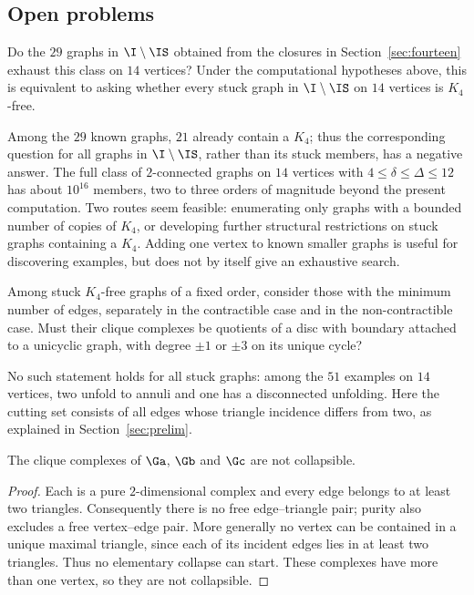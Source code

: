 \subsection{Open problems}\label{sec:open}

\begin{question}\label{q:K4}
Do the $29$ graphs in $\I\setminus\IS$ obtained from the closures in Section~\ref{sec:fourteen} exhaust this class on $14$ vertices? Under the computational hypotheses above, this is equivalent to asking whether every stuck graph in $\I\setminus\IS$ on $14$ vertices is $K_4$-free.
\end{question}

Among the $29$ known graphs, $21$ already contain a $K_4$; thus the corresponding question for all graphs in $\I\setminus\IS$, rather than its stuck members, has a negative answer. The full class of $2$-connected graphs on $14$ vertices with $4\le\delta\le\Delta\le 12$ has about $10^{16}$ members, two to three orders of magnitude beyond the present computation. Two routes seem feasible: enumerating only graphs with a bounded number of copies of $K_4$, or developing further structural restrictions on stuck graphs containing a $K_4$. Adding one vertex to known smaller graphs is useful for discovering examples, but does not by itself give an exhaustive search.

\begin{question}\label{conj:disc}
Among stuck $K_4$-free graphs of a fixed order, consider those with the minimum number of edges, separately in the contractible case and in the non-contractible case. Must their clique complexes be quotients of a disc with boundary attached to a unicyclic graph, with degree $\pm1$ or $\pm3$ on its unique cycle?
\end{question}

No such statement holds for all stuck graphs: among the $51$ examples on $14$ vertices, two unfold to annuli and one has a disconnected unfolding. Here the cutting set consists of all edges whose triangle incidence differs from two, as explained in Section~\ref{sec:prelim}.

\begin{proposition}\label{prop:noncollapsible}
The clique complexes of $\Ga$, $\Gb$ and $\Gc$ are not collapsible.
\end{proposition}
\begin{proof}
Each is a pure $2$-dimensional complex and every edge belongs to at least two triangles. Consequently there is no free edge--triangle pair; purity also excludes a free vertex--edge pair. More generally no vertex can be contained in a unique maximal triangle, since each of its incident edges lies in at least two triangles. Thus no elementary collapse can start. These complexes have more than one vertex, so they are not collapsible.
\end{proof}

